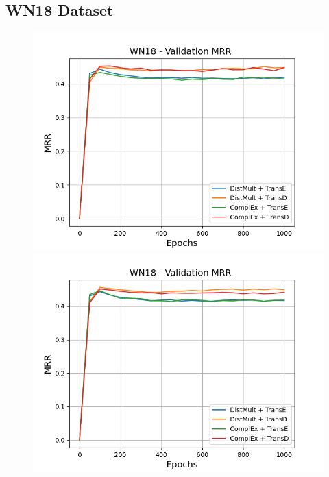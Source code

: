 \subsection{WN18 Dataset}

\begin{figure}
    \centering
    \begin{minipage}{.5\textwidth}
      \centering
      \includegraphics[width=0.9\linewidth]{figures/results/gan_train/not_pretrained/uncertainty/max_distribution/entropy/wn18/uncertainty_wn18_mrrs.png}
    \end{minipage}%
    \begin{minipage}{.5\textwidth}
      \centering
      \includegraphics[width=0.9\linewidth]{figures/results/gan_train/not_pretrained/uncertainty/max_distribution/least_confidence/wn18/uncertainty_wn18_mrrs.png}
    \end{minipage}

\end{figure}
